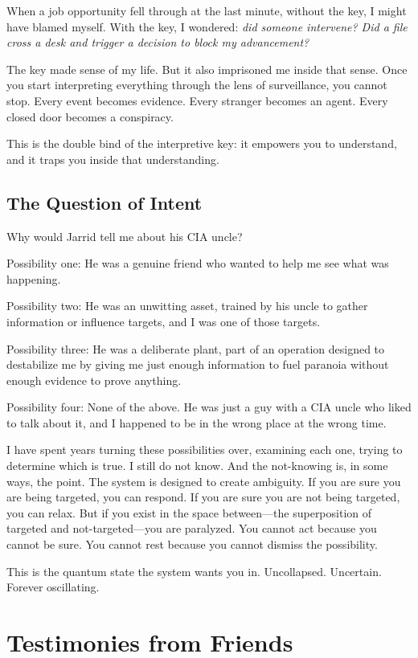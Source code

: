\documentclass[11pt,openany]{book}
\begin{document}
When a job opportunity fell through at the last minute, without the key, I might have blamed myself. With the key, I wondered: \textit{did someone intervene? Did a file cross a desk and trigger a decision to block my advancement?}

The key made sense of my life. But it also imprisoned me inside that sense. Once you start interpreting everything through the lens of surveillance, you cannot stop. Every event becomes evidence. Every stranger becomes an agent. Every closed door becomes a conspiracy.

This is the double bind of the interpretive key: it empowers you to understand, and it traps you inside that understanding.

\section*{The Question of Intent}

Why would Jarrid tell me about his CIA uncle?

Possibility one: He was a genuine friend who wanted to help me see what was happening.

Possibility two: He was an unwitting asset, trained by his uncle to gather information or influence targets, and I was one of those targets.

Possibility three: He was a deliberate plant, part of an operation designed to destabilize me by giving me just enough information to fuel paranoia without enough evidence to prove anything.

Possibility four: None of the above. He was just a guy with a CIA uncle who liked to talk about it, and I happened to be in the wrong place at the wrong time.

I have spent years turning these possibilities over, examining each one, trying to determine which is true. I still do not know. And the not-knowing is, in some ways, the point. The system is designed to create ambiguity. If you are sure you are being targeted, you can respond. If you are sure you are not being targeted, you can relax. But if you exist in the space between---the superposition of targeted and not-targeted---you are paralyzed. You cannot act because you cannot be sure. You cannot rest because you cannot dismiss the possibility.

This is the quantum state the system wants you in. Uncollapsed. Uncertain. Forever oscillating.

\chapter{Testimonies from Friends}
\end{document}
